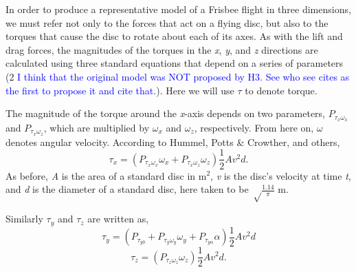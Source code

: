 \documentclass[a4paper,12pt, oneside]{article}
\newcommand{\red}[1]{\textcolor{red}{#1}}
\newcommand{\blue}[1]{\textcolor{blue}{#1}}
\begin{document}
In order to produce a representative model of a Frisbee flight in three dimensions, we must refer not only to the forces that act on a flying disc, but also to the torques that cause the disc to rotate about each of its axes. As with the lift and drag forces, the magnitudes of the torques in the \textit{x}, \textit{y}, and \textit{z} directions are calculated using three standard equations that depend on a series of parameters (2 \blue{I think that the original model was NOT proposed by H3. See who see cites as the first to propose it and cite that.}). Here we will use $\tau$ to denote torque.

The magnitude of the torque around the \textit{x}-axis depends on two parameters, $P_{\tau_x\omega_x}$ and $P_{\tau_x\omega_z}$, which are multiplied by $\omega_x$ and $\omega_z$, respectively. From here on, $\omega$ denotes angular velocity. According to Hummel, Potts \& Crowther, and others,
\begin{equation}
  \tau_x=(P_{\tau_x\omega_x}\omega_x+P_{\tau_x\omega_z}\omega_z)\frac{1}2Av^2d.
\end{equation}
As before, \textit{A} is the area of a standard disc in m$^2$, \textit{v} is the disc's velocity at time \textit{t}, and \textit{d} is the diameter of a standard disc, here taken to be $\sqrt\frac{1.14}\pi$ m.

Similarly $\tau_y$ and $\tau_z$ are written as,
\begin{equation}
  \tau_y=(P_{\tau_{y0}}+P_{\tau_y\omega_y}\omega_y+P_{\tau_{y\alpha}}\alpha)\frac{1}2Av^2d
\end{equation}
\begin{equation}
  \tau_z=(P_{\tau_z\omega_z}\omega_z)\frac{1}2Av^2d.
\end{equation}
\end{document}
